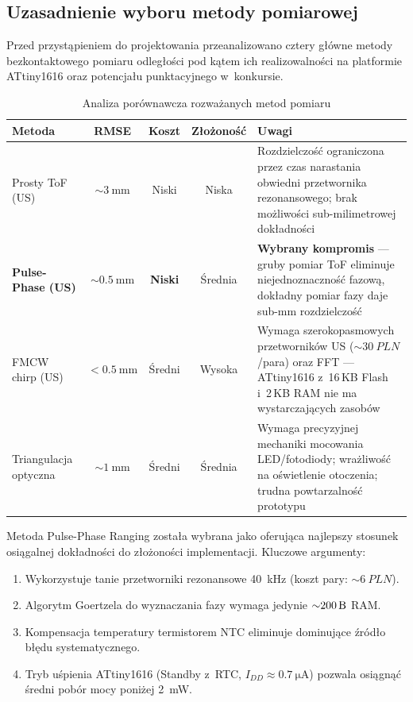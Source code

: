 \documentclass[a4paper,11pt]{article}
\begin{document}
	\subsection{Uzasadnienie wyboru metody pomiarowej}
	
	Przed przystąpieniem do projektowania przeanalizowano cztery główne metody
	bezkontaktowego pomiaru odległości pod kątem ich realizowalności na platformie
	ATtiny1616 oraz potencjału punktacyjnego w~konkursie.
	
	\begin{table}[H]
		\centering
		\caption{Analiza porównawcza rozważanych metod pomiaru}
		\label{tab:porownanie_metod}
		\begin{tabularx}{\textwidth}{lcccX}
			\toprule
			\textbf{Metoda} & \textbf{RMSE} & \textbf{Koszt} & \textbf{Złożoność} & \textbf{Uwagi} \\
			\midrule
			Prosty ToF (US)
			& ${\sim}\SI{3}{\milli\metre}$
			& Niski
			& Niska
			& Rozdzielczość ograniczona przez czas narastania obwiedni przetwornika rezonansowego; brak możliwości sub-milimetrowej dokładności \\[6pt]
			\textbf{Pulse-Phase (US)}
			& ${\sim}\SI{0,5}{\milli\metre}$
			& \textbf{Niski}
			& Średnia
			& \textbf{Wybrany kompromis} --- gruby pomiar ToF eliminuje niejednoznaczność fazową, dokładny pomiar fazy daje sub-mm rozdzielczość \\[6pt]
			FMCW chirp (US)
			& ${<}\SI{0,5}{\milli\metre}$
			& Średni
			& Wysoka
			& Wymaga szerokopasmowych przetworników US (${\sim}\SI{30}{PLN}$/para) oraz FFT --- ATtiny1616 z~16\,KB Flash i~2\,KB RAM nie ma wystarczających zasobów \\[6pt]
			Triangulacja optyczna
			& ${\sim}\SI{1}{\milli\metre}$
			& Średni
			& Średnia
			& Wymaga precyzyjnej mechaniki mocowania LED/fotodiody; wrażliwość na oświetlenie otoczenia; trudna powtarzalność prototypu \\
			\bottomrule
		\end{tabularx}
	\end{table}
	
	Metoda Pulse-Phase Ranging została wybrana jako oferująca najlepszy stosunek
	osiągalnej dokładności do złożoności implementacji. Kluczowe argumenty:
	
	\begin{enumerate}[nosep]
		\item Wykorzystuje tanie przetworniki rezonansowe \SI{40}{\kilo\hertz} (koszt pary: ${\sim}\SI{6}{PLN}$).
		\item Algorytm Goertzela do wyznaczania fazy wymaga jedynie ${\sim}\SI{200}{\byte}$ RAM.
		\item Kompensacja temperatury termistorem NTC eliminuje dominujące źródło błędu systematycznego.
		\item Tryb uśpienia ATtiny1616 (Standby z~RTC, $I_{DD} \approx \SI{0,7}{\micro\ampere}$) pozwala osiągnąć średni pobór mocy poniżej \SI{2}{\milli\watt}.
	\end{enumerate}
	
\end{document}
